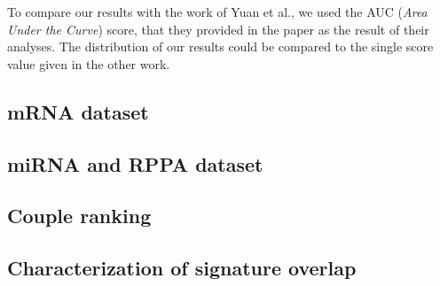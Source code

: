 \documentclass{standalone}
\begin{document}
To compare our results with the work of Yuan et al., we used the AUC (\emph{Area Under the Curve}) score, that they provided in the paper as the result of their analyses.
The distribution of our results could be compared to the single score value given in the other work.


\subsection[mRNA data]{mRNA dataset}\label{mRNA}


\subsection[miRNA and RPPA data]{miRNA and RPPA dataset}\label{miRNA}

\subsection[Ranking]{Couple ranking}\label{ranking}

\subsection[Signature Overlap]{Characterization of signature overlap}\label{overlap}

\end{document}
